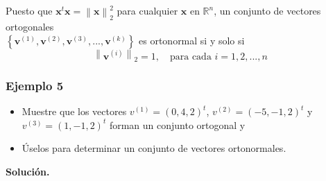 \documentclass[12pt, a4paper]{article}
\numberwithin{subsection}{section} %
\begin{document}
        Puesto que $\textbf{x}^{t}\textbf{x}=\left\| \textbf{x} \right\|_{2}^{2}$ para  cualquier $\textbf{x}$ en $\mathbb{R}^{n}$, un conjunto de vectores ortogonales \\$\left\{ \textbf{v}^{\left( 1 \right)}, \textbf{v}^{\left( 2 \right)}, \textbf{v}^{\left( 3 \right)}, ..., \textbf{v}^{\left( k \right)} \right\}$ es ortonormal si y solo si
        \begin{equation*}
        \left\| \textbf{v}^{\left( i \right)} \right\|_{2} = 1, \quad \text{para cada } i = 1, 2, ..., n
        \end{equation*}
        
        \subsubsection*{Ejemplo 5}
        
        \begin{itemize}
            \item Muestre que los vectores $v^{(1)} = (0, 4, 2)^t$, $v^{(2)} = (-5,-1, 2)^t$ y $v^{(3)} = (1,-1, 2)^t$ forman un conjunto ortogonal y
            \item Úselos para determinar un conjunto de vectores ortonormales.
        \end{itemize}
        
        {\bf Solución.}
\end{document}
